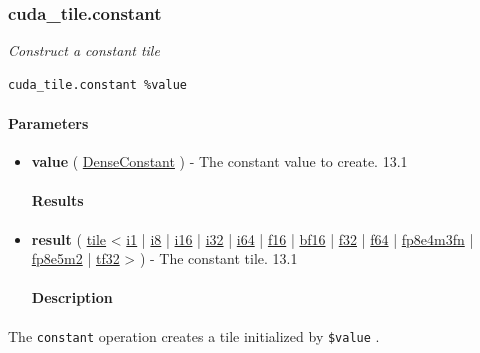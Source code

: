 \documentclass{article}
\begin{document}
\subsubsection{cuda\_tile.constant}

\textit{Construct a constant tile}


\begin{lstlisting}
cuda_tile.constant %value
\end{lstlisting}

\paragraph{Parameters}

\begin{itemize}
\item \textbf{value} ( \href{https://docs.nvidia.com/cuda/tile-ir/latest/sections/operations.html#type-denseconstant}{DenseConstant} ) - The constant value to create. 13.1


\paragraph{Results}

\item \textbf{result} ( \href{https://docs.nvidia.com/cuda/tile-ir/latest/sections/types.html#type-tile}{tile} < \href{https://docs.nvidia.com/cuda/tile-ir/latest/sections/types.html#subsection-element-types}{i1} | \href{https://docs.nvidia.com/cuda/tile-ir/latest/sections/types.html#subsection-element-types}{i8} | \href{https://docs.nvidia.com/cuda/tile-ir/latest/sections/types.html#subsection-element-types}{i16} | \href{https://docs.nvidia.com/cuda/tile-ir/latest/sections/types.html#subsection-element-types}{i32} | \href{https://docs.nvidia.com/cuda/tile-ir/latest/sections/types.html#subsection-element-types}{i64} | \href{https://docs.nvidia.com/cuda/tile-ir/latest/sections/types.html#subsection-element-types}{f16} | \href{https://docs.nvidia.com/cuda/tile-ir/latest/sections/types.html#subsection-element-types}{bf16} | \href{https://docs.nvidia.com/cuda/tile-ir/latest/sections/types.html#subsection-element-types}{f32} | \href{https://docs.nvidia.com/cuda/tile-ir/latest/sections/types.html#subsection-element-types}{f64} | \href{https://docs.nvidia.com/cuda/tile-ir/latest/sections/types.html#subsection-element-types}{fp8e4m3fn} | \href{https://docs.nvidia.com/cuda/tile-ir/latest/sections/types.html#subsection-element-types}{fp8e5m2} | \href{https://docs.nvidia.com/cuda/tile-ir/latest/sections/types.html#subsection-element-types}{tf32} > ) - The constant tile. 13.1


\paragraph{Description}

\end{itemize}
The \texttt{constant} operation creates a tile initialized by \texttt{\$value} .
\end{document}
